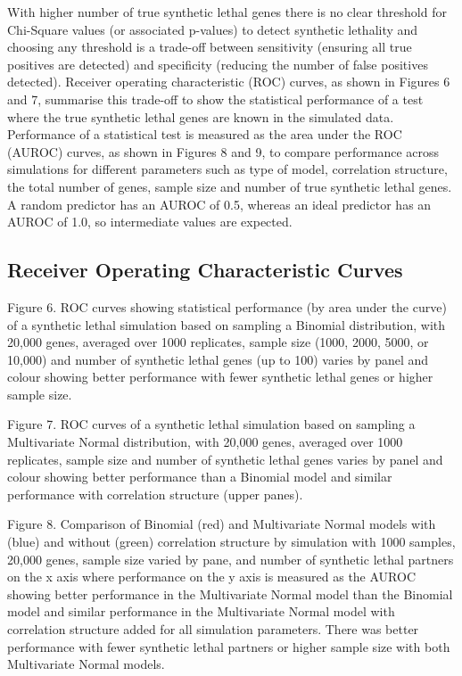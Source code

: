 With higher number of true synthetic lethal genes there is no clear threshold for Chi-Square values (or associated p-values) to detect synthetic lethality and choosing any threshold is a trade-off between sensitivity (ensuring all true positives are detected) and specificity (reducing the number of false positives detected).  Receiver operating characteristic (ROC) curves, as shown in Figures 6 and 7, summarise this trade-off to show the statistical performance of a test where the true synthetic lethal genes are known in the simulated data.  Performance of a statistical test is measured as the area under the ROC (AUROC) curves, as shown in Figures 8 and 9, to compare performance across simulations for different parameters such as type of model, correlation structure, the total number of genes, sample size and number of true synthetic lethal genes.  A random predictor has an AUROC of 0.5, whereas an ideal predictor has an AUROC of 1.0, so intermediate values are expected.

\subsection{Receiver Operating Characteristic Curves}

Figure 6.   ROC curves showing statistical performance (by area under the curve) of a synthetic lethal simulation based on sampling a Binomial distribution, with 20,000 genes, averaged over 1000 replicates, sample size (1000, 2000, 5000, or 10,000) and number of synthetic lethal genes (up to 100) varies by panel and colour showing better performance with fewer synthetic lethal genes or higher sample size.    

Figure 7.   ROC curves of a synthetic lethal simulation based on sampling a Multivariate Normal distribution, with 20,000 genes, averaged over 1000 replicates, sample size and number of synthetic lethal genes varies by panel and colour showing better performance than a Binomial model and similar performance with correlation structure (upper panes).

Figure 8.  Comparison of Binomial (red) and Multivariate Normal models with (blue) and without (green) correlation structure by simulation with 1000 samples, 20,000 genes, sample size varied by pane, and number of synthetic lethal partners on the x axis where performance on the y axis is measured as the AUROC showing better performance in the Multivariate Normal model than the Binomial model and similar performance in the Multivariate Normal model with correlation structure added for all simulation parameters.  There was better performance with fewer synthetic lethal partners or higher sample size with both Multivariate Normal models.   

